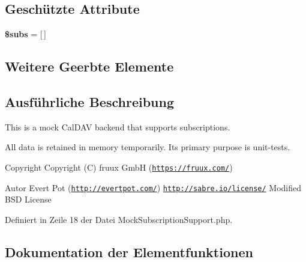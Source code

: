 \subsection*{Geschützte Attribute}
\begin{DoxyCompactItemize}
\item 
\mbox{\label{class_sabre_1_1_cal_d_a_v_1_1_backend_1_1_mock_subscription_support_aee952c9a7d03930094fd23b72ad5b84a}} 
{\bfseries \$subs} = \mbox{[}$\,$\mbox{]}
\end{DoxyCompactItemize}
\subsection*{Weitere Geerbte Elemente}


\subsection{Ausführliche Beschreibung}
This is a mock Cal\+D\+AV backend that supports subscriptions.

All data is retained in memory temporarily. It\textquotesingle{}s primary purpose is unit-\/tests.

\begin{DoxyCopyright}{Copyright}
Copyright (C) fruux GmbH (\href{https://fruux.com/}{\tt https\+://fruux.\+com/}) 
\end{DoxyCopyright}
\begin{DoxyAuthor}{Autor}
Evert Pot (\href{http://evertpot.com/}{\tt http\+://evertpot.\+com/})  \href{http://sabre.io/license/}{\tt http\+://sabre.\+io/license/} Modified B\+SD License 
\end{DoxyAuthor}


Definiert in Zeile 18 der Datei Mock\+Subscription\+Support.\+php.



\subsection{Dokumentation der Elementfunktionen}
\mbox{\label{class_sabre_1_1_cal_d_a_v_1_1_backend_1_1_mock_subscription_support_aa8c4a1d6cdef00c3191810599cfb1e7d}} 
